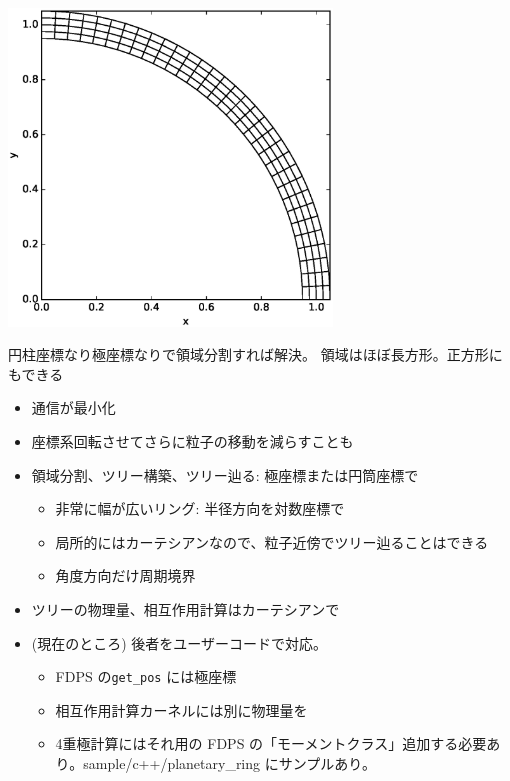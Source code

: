 \documentclass[12pt,dvipdfmx]{article}
\begin{document}
\begin{minipage}[b]{9cm}
\begin{center}
\includegraphics[width=8.6cm]{domain_cyl.eps}
\end{center}
\end{minipage}
\begin{minipage}[b]{6cm}
\raggedright

円柱座標なり極座標なりで領域分割すれば解決。
領域はほぼ長方形。正方形にもできる

\begin{itemize}

\item 通信が最小化

\item 座標系回転させてさらに粒子の移動を減らすことも

\end{itemize}


\end{minipage}



\begin{itemize}

\item 領域分割、ツリー構築、ツリー辿る: 極座標または円筒座標で
\begin{itemize}
\item 非常に幅が広いリング: 半径方向を対数座標で
\item 局所的にはカーテシアンなので、粒子近傍でツリー辿ることはできる
\item 角度方向だけ周期境界
\end{itemize}
\item ツリーの物理量、相互作用計算はカーテシアンで
\item (現在のところ) 後者をユーザーコードで対応。
\begin{itemize}
\item FDPS の{\tt get\_pos} には極座標
\item 相互作用計算カーネルには別に物理量を
\item 4重極計算にはそれ用の FDPS の「モーメントクラス」追加する必要あ
り。sample/c++/planetary\_ring にサンプルあり。

\end{itemize}
\end{itemize}
\end{document}
